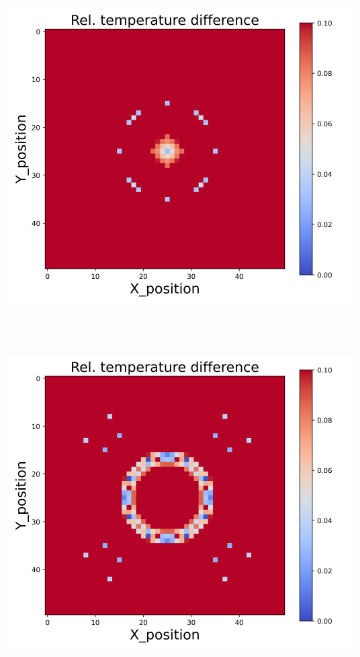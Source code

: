 {\begin{figure}[h]
\begin{minipage}{\textwidth}
\begin{subfigure}{0.27\textwidth}
        \end{subfigure}
        \begin{subfigure}{0.27\textwidth}
            \centering
            \includegraphics[width=\textwidth]{figures/raw_data/31/exp/T_bias.jpg}
        \end{subfigure}
    \end{minipage}\\
    \begin{minipage}{\textwidth}
        \centering
        \begin{subfigure}{0.27\textwidth}
            \centering
            \includegraphics[width=\textwidth]{figures/raw_data/32/exp/T_bias.jpg}

\end{subfigure}
\end{minipage}
\end{figure}}
